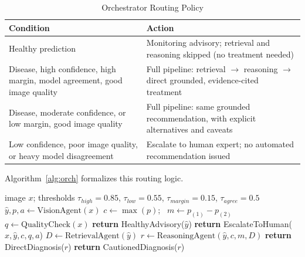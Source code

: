 \documentclass[conference]{IEEEtran}
\begin{document}
\begin{table}[t]
\centering
\caption{Orchestrator Routing Policy}
\label{tab:policy}
\small
\begin{tabular}{p{3.6cm}p{3.6cm}}
\toprule
\textbf{Condition} & \textbf{Action} \\
\midrule
Healthy prediction & Monitoring advisory; retrieval and reasoning skipped (no treatment needed) \\
Disease, high confidence, high margin, model agreement, good image quality & Full pipeline: retrieval $\rightarrow$ reasoning $\rightarrow$ direct grounded, evidence-cited treatment \\
Disease, moderate confidence, or low margin, good image quality & Full pipeline: same grounded recommendation, with explicit alternatives and caveats \\
Low confidence, poor image quality, or heavy model disagreement & Escalate to human expert; no automated recommendation issued \\
\bottomrule
\end{tabular}
\end{table}

Algorithm~\ref{alg:orch} formalizes this routing logic.

\begin{algorithm}[t]
\caption{Orchestrator Routing Policy}
\label{alg:orch}
\begin{algorithmic}[1]
\REQUIRE image $x$; thresholds $\tau_{high}=0.85$, $\tau_{low}=0.55$, $\tau_{margin}=0.15$, $\tau_{agree}=0.5$
\STATE $\hat{y}, p, a \leftarrow \text{VisionAgent}(x)$ 
\STATE $c \leftarrow \max(p)$; \ $m \leftarrow p_{(1)} - p_{(2)}$ 
\STATE $q \leftarrow \text{QualityCheck}(x)$ 
    \STATE \textbf{return} HealthyAdvisory($\hat{y}$) 
    \STATE \textbf{return} EscalateToHuman($x, \hat{y}, c, q, a$)
\ELSE
    \STATE $D \leftarrow \text{RetrievalAgent}(\hat{y})$ 
    \STATE $r \leftarrow \text{ReasoningAgent}(\hat{y}, c, m, D)$
        \STATE \textbf{return} DirectDiagnosis($r$) 
    \ELSE
        \STATE \textbf{return} CautionedDiagnosis($r$) 
    \ENDIF
\ENDIF
\end{algorithmic}
\end{algorithm}
\end{document}
